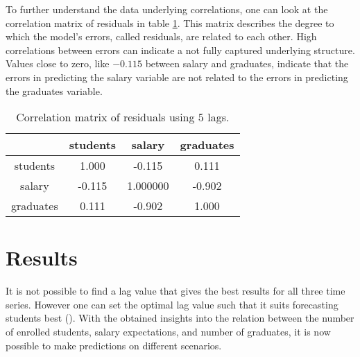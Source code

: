 \documentclass{article}
\theoremstyle{plain}
\theoremstyle{definition}
\theoremstyle{remark}
\begin{document}
To further understand the data underlying correlations, one can look at the correlation matrix
of residuals in table \ref{table:correlation matrix}.
This matrix describes the degree to which the model's errors, called residuals, are related to each other.
High correlations between errors can indicate a not fully captured underlying structure.
Values close to zero, like $-0.115$ between salary and graduates, indicate that the errors
in predicting the salary variable are not related to the errors in predicting the graduates variable.


\begin{table}[H]
    \centering
    \begin{tabular}{c|c|c|c}
        & students & salary & graduates\\
        \hline
        students & 1.000 & -0.115 &  0.111\\
        \hline
        salary & -0.115 & 1.000000 & -0.902\\
        \hline
        graduates & 0.111 & -0.902 &  1.000\\
    \end{tabular}
    \caption{Correlation matrix of residuals using $5$ lags.}
    \label{table:correlation matrix}
\end{table}

% 

\section{Results}\label{sec:results}
It is not possible to find a lag value that gives the best results for all three time series.
However one can set the optimal lag value such that it suits forecasting students best ().
With the obtained insights into the relation between the number of enrolled students, salary expectations, and number of graduates,
it is now possible to make predictions on different scenarios.
\end{document}
